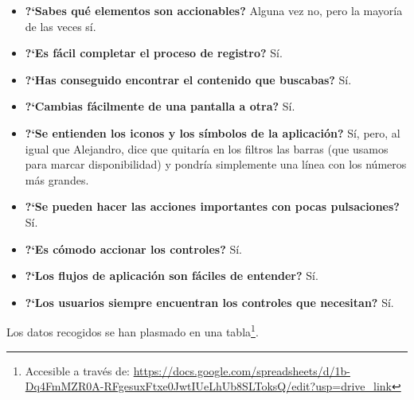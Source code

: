 \begin{itemize}
    \item \textbf{?`Sabes qué elementos son accionables?} Alguna vez no, pero la mayoría de las veces sí. 
    \item \textbf{?`Es fácil completar el proceso de registro?} Sí. 
    \item \textbf{?`Has conseguido encontrar el contenido que buscabas?} Sí.
    \item \textbf{?`Cambias fácilmente de una pantalla a otra?} Sí.
    \item \textbf{?`Se entienden los iconos y los símbolos de la aplicación?} Sí, pero, al igual que Alejandro, dice que
        quitaría en los filtros las barras (que usamos para marcar disponibilidad) y pondría simplemente una línea con los números más grandes. 
    \item \textbf{?`Se pueden hacer las acciones importantes con pocas pulsaciones?} Sí.
    \item \textbf{?`Es cómodo accionar los controles?} Sí.
    \item \textbf{?`Los flujos de aplicación son fáciles de entender?} Sí.
    \item \textbf{?`Los usuarios siempre encuentran los controles que necesitan?} Sí.
\end{itemize}

Los datos recogidos se han plasmado en una tabla\footnote{Accesible a través de:
 \url{https://docs.google.com/spreadsheets/d/1b-Dq4FmMZR0A-RFgesuxFtxe0JwtIUeLhUb8SLToksQ/edit?usp=drive_link}}.
